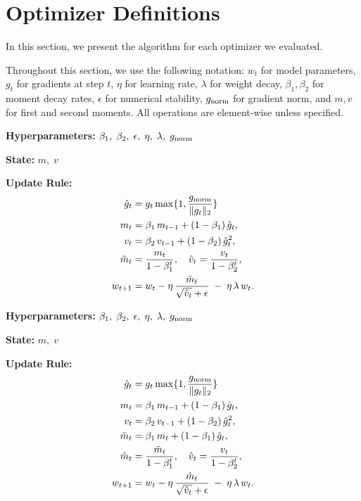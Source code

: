 \section{Optimizer Definitions}
\label{def:optimizerdesign}
In this section, we present the algorithm for each optimizer we evaluated.

Throughout this section, we use the following notation: $w_t$ for model parameters, $g_t$ for gradients at step $t$, $\eta$ for learning rate, $\lambda$ for weight decay, $\beta_1,\beta_2$ for moment decay rates, $\epsilon$ for numerical stability, $g_{\mathrm{norm}}$ for gradient norm, and $m,v$ for first and second moments. All operations are element-wise unless specified.



\begin{algorithm}[H]
  \caption{AdamW}
  \label{alg:adamw}
  \begin{tcolorbox}
  \textbf{Hyperparameters:} $\beta_1,\;\beta_2,\;\epsilon,\;\eta,\;\lambda, \; g_{\mathrm{norm}}$

  \textbf{State:} $m,\;v$

  \textbf{Update Rule:}
  \begin{align*} 
  \hat g_t &= g_t \max\{1, \frac{g_{\mathrm{norm}}}{\|g_t\|_2}\} \\
  m_t &= \beta_1\,m_{t-1} + (1-\beta_1)\, \hat g_t,\\
  v_t &= \beta_2\,v_{t-1} + (1-\beta_2)\, \hat g_t^2,\\
  \hat m_t &= \frac{m_t}{1-\beta_1^t},\quad
  \hat v_t = \frac{v_t}{1-\beta_2^t},\\
  w_{t+1} &= w_t - \eta\,\frac{\hat m_t}{\sqrt{\hat v_t} + \epsilon}
                \;-\;\eta\,\lambda\,w_t.
  \end{align*}
  \end{tcolorbox}
\end{algorithm}
\begin{algorithm}[H]
  \caption{Nesterov AdamW}
  \label{alg:nadamw}
  \begin{tcolorbox}
  \textbf{Hyperparameters:} $\beta_1,\;\beta_2,\;\epsilon,\;\eta,\;\lambda,\;g_{\mathrm{norm}}$

  \textbf{State:} $m,\;v$

  \textbf{Update Rule:}
  \begin{align*}
  \hat g_t &= g_t \max\{1, \frac{g_{\mathrm{norm}}}{\|g_t\|_2}\} \\
  m_t &= \beta_1\,m_{t-1} + (1-\beta_1)\,\hat g_t,\\
  v_t &= \beta_2\,v_{t-1} + (1-\beta_2)\,\hat g_t^2,\\
  \tilde m_t &= \beta_1\,m_t + (1-\beta_1)\,\hat g_t,\\
  \hat m_t &= \frac{\tilde m_t}{1-\beta_1^t},\quad
  \hat v_t = \frac{v_t}{1-\beta_2^t},\\
  w_{t+1} &= w_t 
    - \eta\,\frac{\hat m_t}{\sqrt{\hat v_t} + \epsilon}
    \;-\;\eta\,\lambda\,w_t.
  \end{align*}
  \end{tcolorbox}
\end{algorithm}
